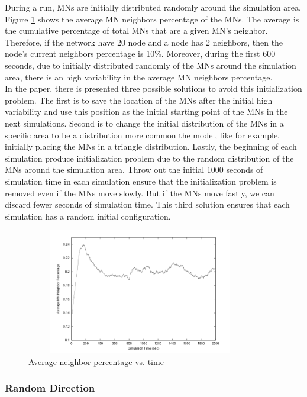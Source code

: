 During a run, MNs are initially distributed randomly around the simulation area. Figure \ref{RandomWaypointFig2} shows the average MN neighbors percentage of the MNs. The average is the cumulative percentage of total MNs that are a given MN's neighbor. Therefore, if the network have 20 node and a node has 2 neighbors, then the node's current neighbors percentage is 10\%. Moreover, during the first 600 seconds, due to initially distributed randomly of the MNs around the simulation area, there is an high variability in the average MN neighbors percentage.\\
In the paper, there is presented three possible solutions to avoid this initialization problem. The first is to save the location of the MNs after the initial high variability and use this position as the initial starting point of the MNs in the next simulations. Second is to change the initial distribution of the MNs in a specific area to be a distribution more common the model, like for example, initially placing the MNs in a triangle distribution. Lastly, the beginning of each simulation produce initialization problem due to the random distribution of the MNs around the simulation area. Throw out the initial 1000 seconds of simulation time in each simulation ensure that the initialization problem is removed even if the MNs move slowly. But if the MNs move fastly, we can discard fewer seconds of simulation time. This third solution ensures that each simulation has a random initial configuration.\\

\begin{figure}[h]
\center
\includegraphics[width=10cm,height=55mm]{../images/randomwaypoint2.png}
\caption{\label{RandomWaypointFig2}Average neighbor percentage vs. time}
\end{figure}

\newpage

\subsubsection{Random Direction}

